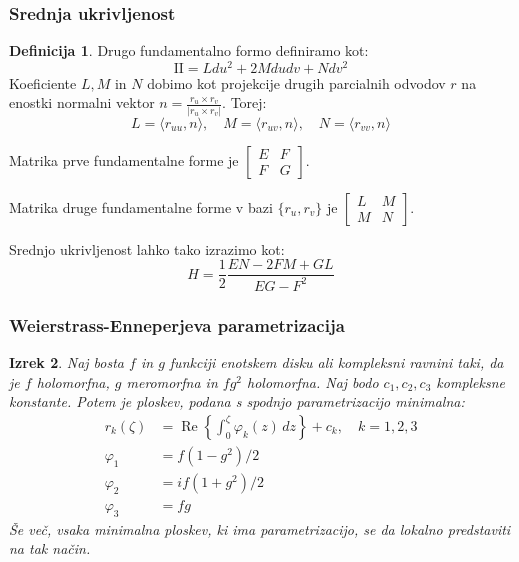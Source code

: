 \documentclass[10pt]{beamer}
\theoremstyle{definition}
\newtheorem{definicija}{Definicija}
\theoremstyle{remark}
\theoremstyle{plain}
\newtheorem{izrek}[definicija]{Izrek}
\numberwithin{equation}{section}  %
\begin{document}
\begin{frame}
    \frametitle{Srednja ukrivljenost}

    \begin{definicija}
        Drugo fundamentalno formo definiramo kot:
        $$
        \mathrm{II}=L d u^2+2 M d u d v+N d v^2
        $$
        Koeficiente $L, M$ in $N$ dobimo kot projekcije drugih parcialnih odvodov $r$ na enostki normalni vektor $n=\frac{r_u \times r_v}{\left|r_u \times r_v\right|}$. Torej: 
        $$
        L=\langle r_{u u}, n \rangle, \quad M=\langle r_{u v}, n\rangle, \quad N= \langle r_{v v}, n \rangle
        $$
        
    \end{definicija}

    Matrika prve fundamentalne forme je $\begin{bmatrix} E & F \\ F & G \end{bmatrix}$.
    
    Matrika druge fundamentalne forme v bazi $\{r_u, r_v\}$ je $\begin{bmatrix} L & M \\ M & N \end{bmatrix}$.

    Srednjo ukrivljenost lahko tako izrazimo kot: 
    $$
    H=\frac{1}{2} \frac{E N-2 F M+G L}{E G-F^2}
    $$
\end{frame}

\begin{frame}
    \frametitle{Weierstrass-Enneperjeva parametrizacija}

    \begin{izrek}
        Naj bosta $f$ in $g$ funkciji enotskem disku ali kompleksni ravnini taki, da je $f$ holomorfna, $g$ meromorfna in $f g^2$ holomorfna. Naj bodo $c_1, c_2, c_3$ kompleksne konstante. Potem je ploskev, podana s spodnjo parametrizacijo minimalna:
        $$
        \begin{aligned}
            r_k(\zeta) & =\operatorname{Re}\left\{\int_0^\zeta \varphi_k(z) \, dz\right\}+c_k, \quad k=1,2,3 \\
            \varphi_1 & =f\left(1-g^2\right) / 2 \\
            \varphi_2 & =i f\left(1+g^2\right) / 2 \\
            \varphi_3 & =f g
        \end{aligned}
        $$
        Še več, vsaka minimalna ploskev, ki ima parametrizacijo, se da lokalno predstaviti na tak način.
    \end{izrek}
\end{frame}
\end{document}
